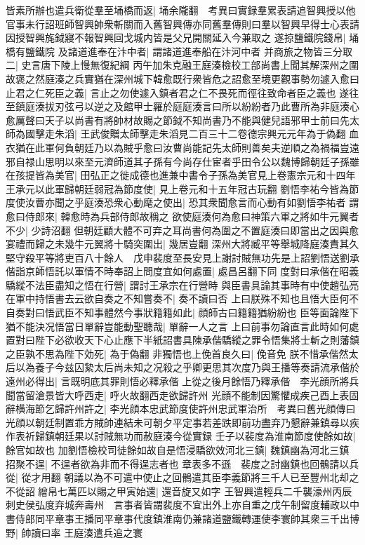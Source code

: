 皆素所辦也遣兵衛從羣至埇橋而返|{
	埇余隴翻　考異曰實録羣累表請追智興授以他官事未行詔班師智興帥衆斬關而入舊智興傳亦同舊羣傳則曰羣以智興早得士心表請因授智興旄鉞寢不報智興回戈城内皆是父兄開關延入今兼取之}
遂掠鹽鐵院錢帛|{
	埇橋有鹽鐵院}
及諸道進奉在汴中者|{
	謂諸道進奉船在汴河中者}
并商旅之物皆三分取二|{
	史言唐下陵上慢無復紀綱}
丙午加朱克融王庭湊檢校工部尚書上聞其解深州之圍故褒之然庭湊之兵實猶在深州城下韓愈既行衆皆危之詔愈至境更觀事勢勿遽入愈曰止君之仁死臣之義|{
	言止之勿使遽入鎮者君之仁不畏死而徑往致命者臣之義也}
遂往至鎮庭湊拔刃弦弓以逆之及館甲士羅於庭庭湊言曰所以紛紛者乃此曹所為非庭湊心愈厲聲曰天子以尚書有將帥材故賜之節鉞不知尚書乃不能與健兒語邪甲士前曰先太師為國擊走朱滔|{
	王武俊贈太師擊走朱滔見二百三十二卷德宗興元元年為于偽翻}
血衣猶在此軍何負朝廷乃以為賊乎愈曰汝曹尚能記先太師則善矣夫逆順之為禍福豈遠邪自禄山思明以來至元濟師道其子孫有今尚存仕宦者乎田令公以魏博歸朝廷子孫雖在孩提皆為美官|{
	田弘正之徙成德也進兼中書令子孫為美官見上卷憲宗元和十四年}
王承元以此軍歸朝廷弱冠為節度使|{
	見上卷元和十五年冠古玩翻}
劉悟李祐今皆為節度使汝曹亦聞之乎庭湊恐衆心動麾之使出|{
	恐其衆聞愈言而心動有如劉悟李祐者}
謂愈曰侍郎來|{
	韓愈時為兵部侍郎故稱之}
欲使庭湊何為愈曰神策六軍之將如牛元翼者不少|{
	少詩沼翻}
但朝廷顧大體不可弃之耳尚書何為圍之不置庭湊曰即當出之因與愈宴禮而歸之未幾牛元翼將十騎突圍出|{
	幾居豈翻}
深州大將臧平等舉城降庭湊責其久堅守殺平等將吏百八十餘人　戊申裴度至長安見上謝討賊無功先是上詔劉悟送劉承偕詣京師悟託以軍情不時奉詔上問度宜如何處置|{
	處昌呂翻下同}
度對曰承偕在昭義驕縱不法臣盡知之悟在行營|{
	謂討王承宗在行營時}
與臣書具論其事時有中使趙弘亮在軍中持悟書去云欲自奏之不知嘗奏不|{
	奏不讀曰否}
上曰朕殊不知也且悟大臣何不自奏對曰悟武臣不知事體然今事狀籍籍如此|{
	顔師古曰籍籍猶紛紛也}
臣等面論陛下猶不能決况悟當日單辭豈能動聖聽哉|{
	單辭一人之言}
上曰前事勿論直言此時如何處置對曰陛下必欲收天下心止應下半紙詔書具陳承偕驕縱之罪令悟集將士斬之則藩鎮之臣孰不思為陛下効死|{
	為于偽翻}
非獨悟也上俛首良久曰|{
	俛音免}
朕不惜承偕然太后以為養子今兹囚縶太后尚未知之况殺之乎卿更思其次度乃與王播等奏請流承偕於遠州必得出|{
	言既明底其罪則悟必釋承偕}
上從之後月餘悟乃釋承偕　李光顔所將兵聞當留滄景皆大呼西走|{
	呼火故翻西走欲歸許州}
光顔不能制因驚懼成疾己酉上表固辭横海節乞歸許州許之|{
	李光顔本忠武節度使許州忠武軍治所　考異曰舊光顔傳曰光顔以朝廷制置乖方賊帥連結未可朝夕平定事若差跌即前功盡弃乃懇辭兼鎮尋以疾作表祈歸鎮朝廷果以討賊無功而赦庭湊今從實録}
壬子以裴度為淮南節度使餘如故|{
	餘官如故也}
加劉悟檢校司徒餘如故自是悟浸驕欲效河北三鎮|{
	魏鎮幽為河北三鎮}
招聚不逞|{
	不逞者欲為非而不得逞志者也}
章表多不遜　裴度之討幽鎮也回鶻請以兵從|{
	從才用翻}
朝議以為不可遣中使止之回鶻遣其臣李義節將三千人已至豐州北却之不從詔繒帛七萬匹以賜之甲寅始還|{
	還音旋又如字}
王智興遣輕兵二千襲濠州丙辰刺史侯弘度弃城奔壽州　言事者皆謂裴度不宜出外上亦自重之戊午制留度輔政以中書侍郎同平章事王播同平章事代度鎮淮南仍兼諸道鹽鐵轉運使李寰帥其衆三千出博野|{
	帥讀曰率}
王庭湊遣兵追之寰

